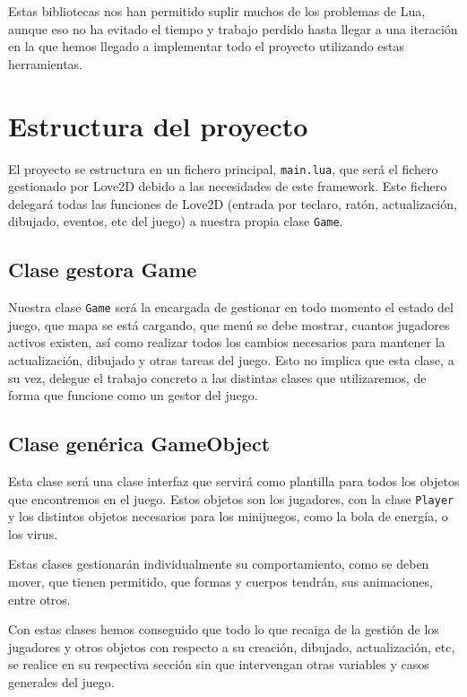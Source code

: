 \documentclass[12pt, spanish]{article}
\begin{document}
Estas bibliotecas nos han permitido suplir muchos de los problemas de Lua, aunque eso no ha evitado el tiempo y trabajo perdido hasta llegar a una iteración en la que hemos llegado a implementar todo el proyecto utilizando estas herramientas.

\section{Estructura del proyecto}

El proyecto se estructura en un fichero principal, \texttt{main.lua}, que será el fichero gestionado por Love2D debido a las necesidades de este framework. Este fichero delegará todas las funciones de Love2D (entrada por teclaro, ratón, actualización, dibujado, eventos, etc del juego) a nuestra propia clase \texttt{Game}.

\subsection{Clase gestora Game}

Nuestra clase \texttt{Game} será la encargada de gestionar en todo momento el estado del juego, que mapa se está cargando, que menú se debe mostrar, cuantos jugadores activos existen, así como realizar todos los cambios necesarios para mantener la actualización, dibujado y otras tareas del juego. Esto no implica que esta clase, a su vez, delegue el trabajo concreto a las distintas clases que utilizaremos, de forma que funcione como un gestor del juego.

\subsection{Clase genérica GameObject}

Esta clase será una clase interfaz que servirá como plantilla para todos los objetos que encontremos en el juego. Estos objetos son los jugadores, con la clase \texttt{Player} y los distintos objetos necesarios para los minijuegos, como la bola de energía, o los virus.

Estas clases gestionarán individualmente su comportamiento, como se deben mover, que tienen permitido, que formas y cuerpos tendrán, sus animaciones, entre otros.

Con estas clases hemos conseguido que todo lo que recaiga de la gestión de los jugadores y otros objetos con respecto a su creación, dibujado, actualización, etc, se realice en su respectiva sección sin que intervengan otras variables y casos generales del juego.
\end{document}
